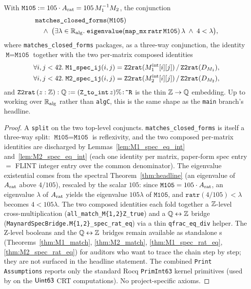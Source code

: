 \begin{theorem}\label{thm:M105}
\rocqok
{}
With $\texttt{M105} := 105 \cdot A_{\mathrm{rat}} = 105\,M_1^{-1}M_2$, the
conjunction
\[
\begin{aligned}
&\texttt{matches\_closed\_forms}(\texttt{M105})\\
&\quad\wedge\;
\bigl(\exists \lambda \in \mathbb{R}_{\mathrm{alg}}.\;
   \texttt{eigenvalue}(\texttt{map\_mx}\,\texttt{ratr}\,\texttt{M105})\,\lambda
   \;\wedge\;
   4 < \lambda\bigr),
\end{aligned}
\]
where \texttt{matches\_closed\_forms} packages, as a three-way
conjunction, the identity $\texttt{M} = \texttt{M105}$ together with the
two per-matrix composed identities
\[
\begin{aligned}
&\forall i, j < 42.\;
  \texttt{M1\_spec\_ij}(i,j)
    = \texttt{Z2rat}(M_1^{\mathrm{int}}[i][j]) \,/\, \texttt{Z2rat}(D_{M_1}),\\
&\forall i, j < 42.\;
  \texttt{M2\_spec\_ij}(i,j)
    = \texttt{Z2rat}(M_2^{\mathrm{int}}[i][j]) \,/\, \texttt{Z2rat}(D_{M_2}),
\end{aligned}
\]
and $\texttt{Z2rat}\,(z : \mathbb{Z}) : \mathbb{Q} := (\texttt{Z\_to\_int}\,z)\%\texttt{:\~{}R}$
is the thin $\mathbb{Z} \to \mathbb{Q}$ embedding. Up to working over $\mathbb{R}_{\mathrm{alg}}$ rather
than \texttt{algC}, this is the same shape as the \texttt{main} branch's
headline.
\end{theorem}
\begin{proof}\rocqok
A \texttt{split} on the two top-level conjuncts.
\texttt{matches\_closed\_forms} is itself a three-way split:
$\texttt{M105} = \texttt{M105}$ is reflexivity, and the two composed
per-matrix identities are
discharged by Lemmas~\ref{lem:M1_spec_eq_int}
and~\ref{lem:M2_spec_eq_int} (each one identity per matrix,
paper-form spec entry $=$ FLINT integer entry over the common
denominator). The eigenvalue existential comes from the spectral
Theorem~\ref{thm:headline} (an eigenvalue of $A_{\mathrm{rat}}$ above $4/105$),
rescaled by the scalar $105$: since $\texttt{M105} = 105\cdot A_{\mathrm{rat}}$, an
eigenvalue $\lambda$ of $A_{\mathrm{rat}}$ yields the eigenvalue $105\lambda$ of
$\texttt{M105}$, and $\texttt{ratr}(4/105) < \lambda$ becomes
$4 < 105\lambda$. The two composed identities each fold
together a $\mathbb{Z}$-level cross-multiplication
(\texttt{all\_match\_M\{1,2\}Z\_true}) and a $\mathbb{Q}\leftrightarrow\mathbb{Z}$
bridge (\texttt{MaynardSpecBridge.M\{1,2\}\_spec\_rat\_eq}) via a thin
\texttt{qfrac\_eq\_div} helper. The Z-level booleans and the
$\mathbb{Q}\leftrightarrow\mathbb{Z}$ bridges remain available as standalone \Qed{}s
(Theorems~\ref{thm:M1_match}, \ref{thm:M2_match},
\ref{thm:M1_spec_rat_eq}, \ref{thm:M2_spec_rat_eq}) for auditors who
want to trace the chain step by step; they are not surfaced in the
headline statement. The combined \texttt{Print Assumptions} reports
only the standard Rocq \texttt{PrimInt63} kernel primitives (used by
\vmcompute{} on the $\mathsf{Uint63}$ CRT computations). No project-specific
axioms.
\end{proof}

